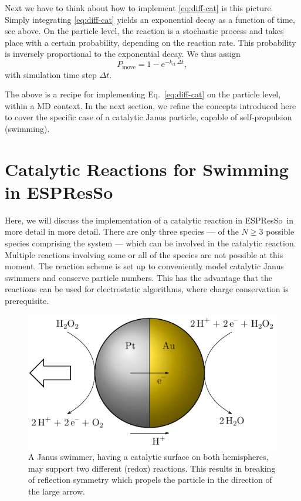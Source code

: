 \documentclass[aip,jcp,reprint,a4paper,onecolumn,nofootinbib,amsmath,amssymb]{revtex4-1}
\newcommand{\es}{\mbox{\textsf{ESPResSo}}\xspace}
\begin{document}
Next we have to think about how to implement \eqref{eq:diff-cat} is this picture. Simply integrating \eqref{eq:diff-cat} yields an exponential decay as a function of time, see above. On the particle level, the reaction is a stochastic process and takes place with a certain probability, depending on the reaction rate. This probability is inversely proportional to the exponential decay. We thus assign
\begin{equation}
  \label{eq:prob}
  P_{\text{move}} = 1 - \mathrm{e}^{-k_{\text{ct}}\,\Delta t} ,
\end{equation}
with simulation time step $\Delta t$.

The above is a recipe for implementing Eq.~\eqref{eq:diff-cat} on the particle level, within a MD context. In the next section, we refine the concepts introduced here to cover the specific case of a catalytic Janus particle, capable of self-propulsion (swimming).

\section{Catalytic Reactions for Swimming in \es}

Here, we will discuss the implementation of a catalytic reaction in \es\ in more detail in more detail. There are only three species --- of the $N \ge 3$ possible species comprising the system --- which can be involved in the catalytic reaction. Multiple reactions involving some or all of the species are not possible at this moment. The reaction scheme is set up to conveniently model catalytic Janus swimmers and conserve particle numbers. This has the advantage that the reactions can be used for electrostatic algorithms, where charge conservation is prerequisite. 

\begin{figure}
  \centering
  \includegraphics{FIGURES/janus-particle}
  \caption{\label{fig:janus}A Janus swimmer, having a catalytic surface on both hemispheres, may support two different (redox) reactions. This results in breaking of reflection symmetry which propels the particle in the direction of the large arrow.}
\end{figure}
\end{document}
